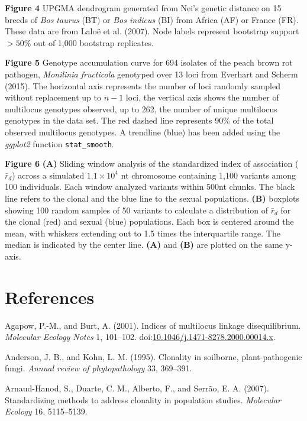 \documentclass{frontiersSCNS} %
\begin{document}
\textbf{Figure 4} UPGMA dendrogram generated from Nei's genetic distance
on 15 breeds of \emph{Bos taurus} (BT) or \emph{Bos indicus} (BI) from
Africa (AF) or France (FR). These data are from Lalo{\"{e}} et al. (2007).
Node labels represent bootstrap support \(>50\%\) out of 1,000 bootstrap
replicates.

\textbf{Figure 5} Genotype accumulation curve for 694 isolates of the
peach brown rot pathogen, \emph{Monilinia fructicola} genotyped over 13
loci from Everhart and Scherm (2015). The horizontal axis represents the
number of loci randomly sampled without replacement up to \(n - 1\)
loci, the vertical axis shows the number of multilocus genotypes
observed, up to 262, the number of unique multilocus genotypes in the
data set. The red dashed line represents 90\% of the total observed
multilocus genotypes. A trendline (blue) has been added using the
\emph{ggplot2} function \texttt{stat\_smooth}.

\textbf{Figure 6} \textbf{(A)} Sliding window analysis of the
standardized index of association (\(\bar{r}_d\)) across a simulated
\(1.1 \times 10^4\) nt chromosome containing 1,100 variants among 100
individuals. Each window analyzed variants within 500nt chunks. The
black line refers to the clonal and the blue line to the sexual
populations. \textbf{(B)} boxplots showing 100 random samples of 50
variants to calculate a distribution of \(\bar{r}_d\) for the clonal
(red) and sexual (blue) populations. Each box is centered around the
mean, with whiskers extending out to 1.5 times the interquartile range.
The median is indicated by the center line. \textbf{(A)} and
\textbf{(B)} are plotted on the same y-axis.

\section*{References}\label{references}

Agapow, P.-M., and Burt, A. (2001). Indices of multilocus linkage
disequilibrium. \emph{Molecular Ecology Notes} 1, 101--102.
doi:\href{http://dx.doi.org/10.1046/j.1471-8278.2000.00014.x}{10.1046/j.1471-8278.2000.00014.x}.

Anderson, J. B., and Kohn, L. M. (1995). Clonality in soilborne,
plant-pathogenic fungi. \emph{Annual review of phytopathology} 33,
369--391.

Arnaud-Hanod, S., Duarte, C. M., Alberto, F., and Serr{\~{a}}o, E. A.
(2007). Standardizing methods to address clonality in population
studies. \emph{Molecular Ecology} 16, 5115--5139.
\end{document}
